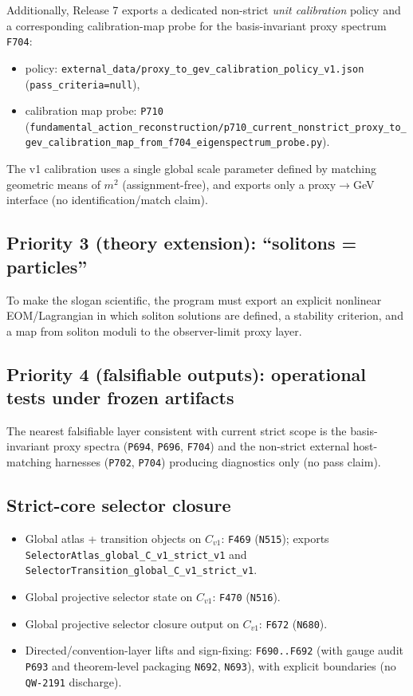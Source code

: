 \documentclass[11pt,a4paper]{article}
\makeatletter
\newcommand{\chapter}{\@ifstar{\section*}{\section}}
\makeatother
\begin{document}
Additionally, Release 7 exports a dedicated non-strict \emph{unit calibration} policy and a corresponding calibration-map probe for the basis-invariant proxy spectrum \texttt{F704}:
\begin{itemize}
  \item policy: \texttt{external\_data/proxy\_to\_gev\_calibration\_policy\_v1.json} (\texttt{pass\_criteria=null}),
  \item calibration map probe: \texttt{P710} (\verb|fundamental_action_reconstruction/p710_current_nonstrict_proxy_to_gev_calibration_map_from_f704_eigenspectrum_probe.py|).
\end{itemize}
The v1 calibration uses a single global scale parameter defined by matching geometric means of $m^2$ (assignment-free), and exports only a proxy$\to$GeV interface (no identification/match claim).

\subsection*{Priority 3 (theory extension): “solitons = particles”}

To make the slogan scientific, the program must export an explicit nonlinear EOM/Lagrangian in which soliton solutions are defined, a stability criterion, and a map from soliton moduli to the observer-limit proxy layer.

\subsection*{Priority 4 (falsifiable outputs): operational tests under frozen artifacts}

The nearest falsifiable layer consistent with current strict scope is the basis-invariant proxy spectra (\texttt{P694}, \texttt{P696}, \texttt{F704}) and the non-strict external host-matching harnesses (\texttt{P702}, \texttt{P704}) producing diagnostics only (no pass claim).

\appendix
\chapter{Export map: key artifacts}
\subsection{Strict-core selector closure}

\begin{itemize}
  \item Global atlas + transition objects on $C_{v1}$: \texttt{F469} (\texttt{N515}); exports \texttt{SelectorAtlas\_global\_C\_v1\_strict\_v1} and \texttt{SelectorTransition\_global\_C\_v1\_strict\_v1}.
  \item Global projective selector state on $C_{v1}$: \texttt{F470} (\texttt{N516}).
  \item Global projective selector closure output on $C_{v1}$: \texttt{F672} (\texttt{N680}).
  \item Directed/convention-layer lifts and sign-fixing: \texttt{F690..F692} (with gauge audit \texttt{P693} and theorem-level packaging \texttt{N692}, \texttt{N693}), with explicit boundaries (no \texttt{QW-2191} discharge).
\end{itemize}
\end{document}
